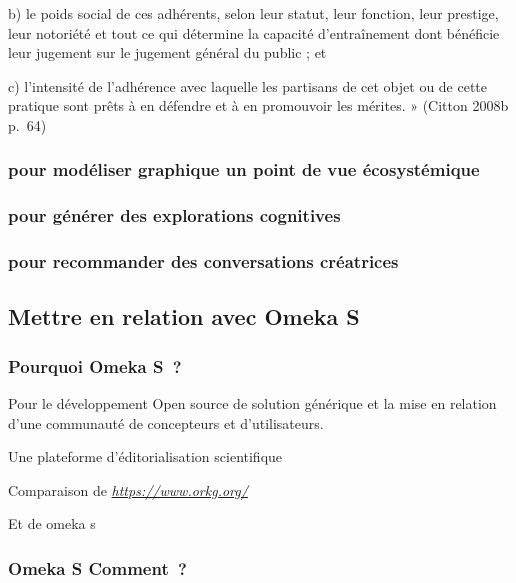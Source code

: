 \documentclass[
  a4paper,
  DIV=11,
  numbers=noendperiod]{scrreprt}
\begin{document}
b) le poids social de ces adhérents, selon leur statut, leur fonction,
leur prestige, leur notoriété et tout ce qui détermine la capacité
d'entraînement dont bénéficie leur jugement sur le jugement général du
public ; et

c) l'intensité de l'adhérence avec laquelle les partisans de cet objet
ou de cette pratique sont prêts à en défendre et à en promouvoir les
mérites. » (Citton 2008b p.~64)

\subsubsection{pour modéliser graphique un point de vue
écosystémique}\label{pour-moduxe9liser-graphique-un-point-de-vue-uxe9cosystuxe9mique}

\subsubsection{pour générer des explorations
cognitives}\label{pour-guxe9nuxe9rer-des-explorations-cognitives}

\subsubsection{pour recommander des conversations
créatrices}\label{pour-recommander-des-conversations-cruxe9atrices}

\subsection{Mettre en relation avec Omeka
S}\label{mettre-en-relation-avec-omeka-s}

\subsubsection{Pourquoi Omeka S~?}\label{pourquoi-omeka-s}

Pour le développement Open source de solution générique et la mise en
relation d'une communauté de concepteurs et d'utilisateurs.

Une plateforme d'éditorialisation scientifique

Comparaison de
\href{https://www.orkg.org/}{\emph{https://www.orkg.org/}}

Et de omeka s

\subsubsection{Omeka S Comment~?}\label{omeka-s-comment}
\end{document}
